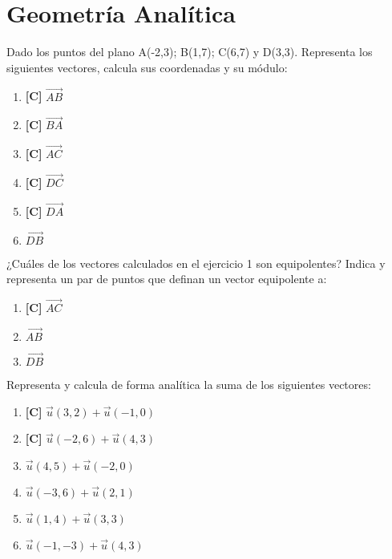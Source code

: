 \chapter{Geometría Analítica}
\setcounter{exercicio}{0}


\Exercicio Dado los puntos del plano A(-2,3); B(1,7); C(6,7) y D(3,3). Representa los siguientes vectores, calcula sus coordenadas y su módulo:

\begin{enumerate}[topsep=0pt]
	\item \textbf{[C]} $\overrightarrow{AB}$
	\item \textbf{[C]} $\overrightarrow{BA}$
	\item \textbf{[C]} $\overrightarrow{AC}$
	\item \textbf{[C]} $\overrightarrow{DC}$
	\item \textbf{[C]} $\overrightarrow{DA}$
	\item $\overrightarrow{DB}$
\end{enumerate}


\Exercicio ¿Cuáles de los vectores calculados en el ejercicio 1 son equipolentes? Indica y representa un par de puntos que definan un vector equipolente a:
\begin{enumerate}[topsep=0pt]
	\item \textbf{[C]}  $\overrightarrow{AC}$
	\item $\overrightarrow{AB}$
	\item $\overrightarrow{DB}$
\end{enumerate}


\Exercicio Representa y calcula de forma analítica la suma de los siguientes vectores:

\begin{enumerate}[topsep=0pt]
	\item \textbf{[C]} $\overrightarrow{u}(3,2) + \overrightarrow{u}(-1,0)$
	\item \textbf{[C]} $\overrightarrow{u}(-2,6) + \overrightarrow{u}(4,3)$
	
	\item $\overrightarrow{u}(4,5) + \overrightarrow{u}(-2,0)$
	\item $\overrightarrow{u}(-3,6) + \overrightarrow{u}(2,1)$
	\item $\overrightarrow{u}(1,4) + \overrightarrow{u}(3,3)$
	\item $\overrightarrow{u}(-1,-3) + \overrightarrow{u}(4,3)$
\end{enumerate}


